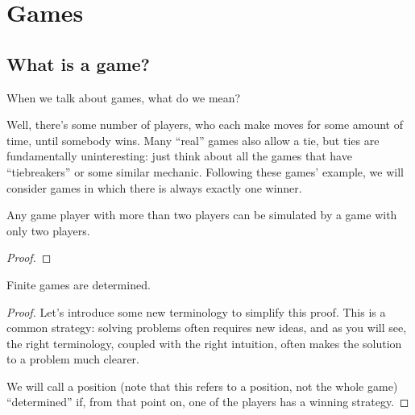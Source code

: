 \section{Games}


\subsection{What is a game?}

When we talk about games, what do we mean?

Well, there's some number of players, who each make moves for some amount of time, until somebody wins.
Many ``real'' games also allow a tie, but ties are fundamentally uninteresting: just think about all the games that have ``tiebreakers'' or some similar mechanic.
Following these games' example, we will consider games in which there is always exactly one winner.


\begin{proposition}
    Any game player with more than two players can be simulated by a game with only two players.
\end{proposition}
\begin{proof}
\end{proof}

\begin{theorem}
    Finite games are determined.
\end{theorem}
\begin{proof}
    Let's introduce some new terminology to simplify this proof.
    This is a common strategy: solving problems often requires new ideas, and as you will see, the right terminology, coupled with the right intuition, often makes the solution to a problem much clearer.

    We will call a position (note that this refers to a position, not the whole game) ``determined''  if, from that point on, one of the players has a winning strategy.
\end{proof}


